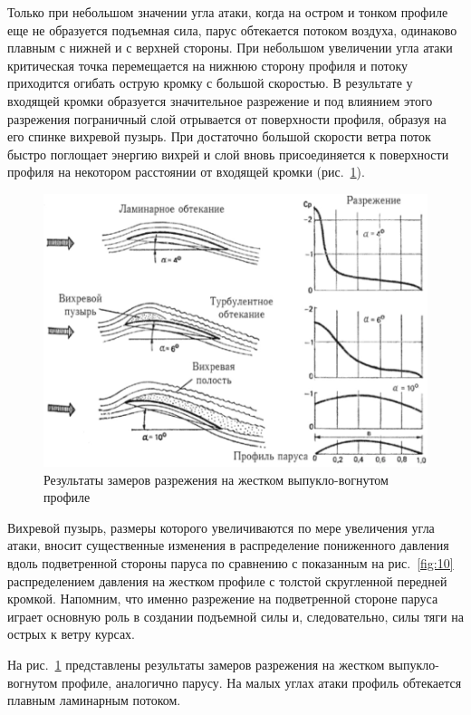 \documentclass[a4paper, 12pt, twoside, final, book, russian, fittopage, cyremdash]{ncc}
\newcommand{\ris}[1]{\ref{fig:#1}}
\begin{document}
Только при небольшом значении угла атаки, когда на остром и тонком профиле еще не образуется подъемная сила, парус обтекается потоком воздуха, одинаково плавным с нижней и с верхней стороны. При небольшом увеличении угла атаки критическая точка перемещается на нижнюю сторону профиля и потоку приходится огибать острую кромку с большой скоростью. В результате у входящей кромки образуется значительное разрежение и под влиянием этого разрежения пограничный слой отрывается от поверхности профиля, образуя на его спинке вихревой пузырь. При достаточно большой скорости ветра поток быстро поглощает энергию вихрей и слой вновь  присоединяется к поверхности профиля на некотором расстоянии от входящей кромки (рис.~\ris{21}).

\begin{figure}[htb]
  \centering
  \includegraphics[scale=1]{0021}
  \caption{Результаты замеров разрежения на жестком выпукло-вогнутом профиле}
  \label{fig:21}
\end{figure}

Вихревой пузырь, размеры которого увеличиваются по мере увеличения угла атаки, вносит существенные изменения в распределение пониженного давления вдоль подветренной стороны паруса по сравнению с показанным на рис.~\ris{10} распределением давления на жестком профиле с толстой скругленной передней кромкой. Напомним, что именно разрежение на подветренной стороне паруса играет основную роль в создании подъемной силы и, следовательно, силы тяги на острых к ветру курсах. 

На рис.~\ris{21} представлены результаты замеров разрежения на жестком выпукло-вогнутом профиле, аналогично парусу. На малых углах атаки профиль обтекается плавным ламинарным потоком. 
\end{document}
